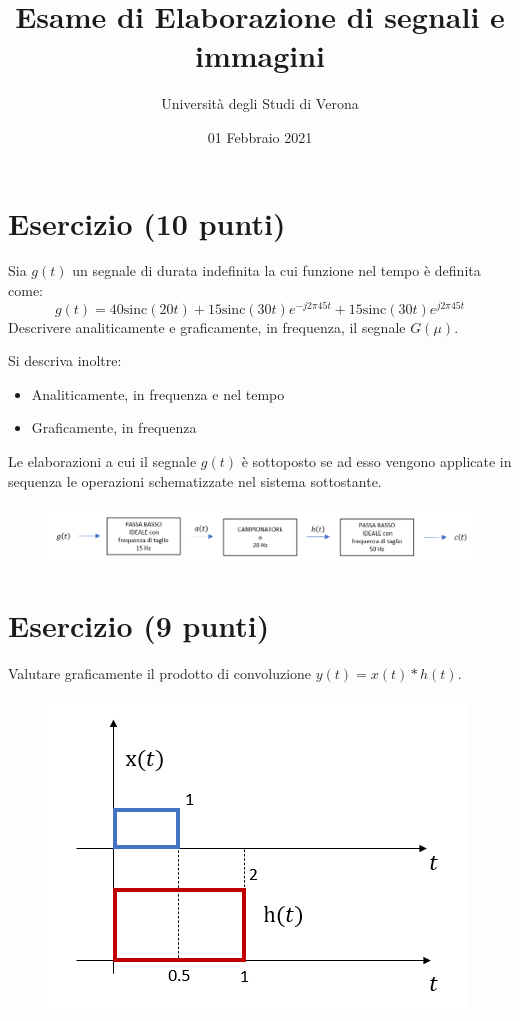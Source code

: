 \documentclass[a4paper]{article}
\begin{document}
	\author{Università degli Studi di Verona}
	\title{Esame di Elaborazione di segnali e immagini}
	\date{{\Large 01 Febbraio 2021}}
	\maketitle
	
	\section{Esercizio (10 punti)}
	
	Sia $g\left(t\right)$ un segnale di durata indefinita la cui funzione nel tempo è definita come:
	\begin{equation*}
		g\left(t\right) = 40\mathrm{sinc}\left(20t\right) + 15\mathrm{sinc}\left(30t\right) e^{-j 2 \pi 45 t} + 15\mathrm{sinc}\left(30t\right) e^{j 2 \pi 45 t}
	\end{equation*}
	Descrivere analiticamente e graficamente, in frequenza, il segnale $G\left(\mu\right)$.\newline
	
	\noindent
	Si descriva inoltre:
	\begin{itemize}
		\item Analiticamente, in frequenza e nel tempo
		\item Graficamente, in frequenza
	\end{itemize}
	Le elaborazioni a cui il segnale $g\left(t\right)$ è sottoposto se ad esso vengono applicate in sequenza le operazioni schematizzate nel sistema sottostante.
	\begin{figure}[!htp]
		\centering
		\includegraphics[width=\textwidth]{img/fig_1.png}
	\end{figure}
	
	\section{Esercizio (9 punti)}
	
	Valutare graficamente il prodotto di convoluzione $y\left(t\right) = x\left(t\right) * h\left(t\right)$.
	\begin{figure}[!htp]
		\centering
		\includegraphics[width=.51\textwidth]{img/fig_2.png}
	\end{figure}\newpage
\end{document}
